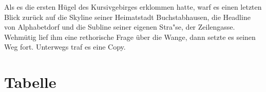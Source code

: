 \noindent Als es die ersten Hügel des Kursivgebirges erklommen hatte, warf es einen letzten Blick zurück auf die Skyline seiner Heimatstadt Buchstabhausen, die Headline von Alphabetdorf und die Subline seiner eigenen Stra"se, der Zeilengasse. Wehmütig lief ihm eine rethorische Frage über die Wange, dann setzte es seinen Weg fort. Unterwegs traf es eine Copy.




%
%
%
%
%
%
%
%
%
%
%
%
%
%
%
%
%

\section{Tabelle}

